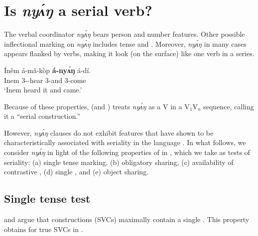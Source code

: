 \documentclass[output=paper,modfonts,nonflat,
]{langsci/langscibook}
\begin{document}
\section{Is \textit{ny\'{ʌ}ŋ} a serial verb?}\label{sec:duncan-et-al:2}

The verbal coordinator \textit{ny\'{ʌ}ŋ} bears person and number features. Other possible inflectional marking on \textit{ny\'{ʌ}ŋ} includes tense and  \citep{essien1985negation,essien1990grammar}. Moreover, \textit{ny\'{ʌ}ŋ} in many cases appears flanked by verbs, making it look (on the surface) like one verb in a series.

\ea\label{ex:duncan-et-al:4}
\gll \'{I}nêm á-m\v{a}-k\`{o}p \textbf{á-ny\'{ʌ}ŋ} á-dí. \\
Inem 3{\SG-\PST}-hear 3{\SG}-and 3{\SG}-come \\
\glt ‘Inem heard it and came.’ \citep[86]{essien1985negation}
\z


\noindent Because of these properties, \citet[86]{essien1985negation} (and \citealt[142]{essien1990grammar}) treats \textit{ny\'{ʌ}ŋ} as a V in a V$_1$V$_n$ sequence, calling it a ``serial construction.''

However,  \textit{ny\'{ʌ}ŋ} clauses do not exhibit features that have shown to be characteristically associated with seriality in the language \citep{major2015serial,duncan2016parallel}. In what follows, we consider \textit{ny\'{ʌ}ŋ} in light of the following properties of  in , which we take as tests of seriality: (a) single tense marking, (b) obligatory  sharing, (c) availability of contrastive , (d) single , and (e) object sharing. 

\subsection{Single tense test}\label{sec:duncan-et-al:2.1}

\citet{collins1997argument} and \citet{hiraiwa2008object} argue that  constructions (SVCs) maximally contain a single . This property obtains for true SVCs in  \citep{major2015serial}.

\ea\label{ex:duncan-et-al:5}
\z
\z
\end{document}
